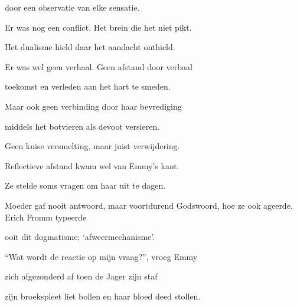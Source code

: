 door een observatie
van elke sensatie.

Er was nog een conflict.
Het brein die het niet pikt.

Het dualisme hield
daar het aandacht onthield.

Er was wel geen verhaal.
Geen afstand door verbaal

toekomst en verleden
aan het hart te smeden.

Maar ook geen verbinding
door haar bevrediging

middels het botvieren
als devoot versieren.

Geen kuise versmelting,
maar juist verwijdering.

Reflectieve afstand
kwam wel van Emmy’s kant.

Ze stelde soms vragen
om haar uit te dagen.

Moeder gaf nooit antwoord,
maar voortdurend Godswoord,
hoe ze ook ageerde.
Erich Fromm typeerde

ooit dit dogmatisme;
‘afweermechanisme’.

“Wat wordt de reactie
op mijn vraag?”, vroeg Emmy

zich afgezonderd af
toen de Jager zijn staf

zijn broekspleet liet bollen
en haar bloed deed stollen.
